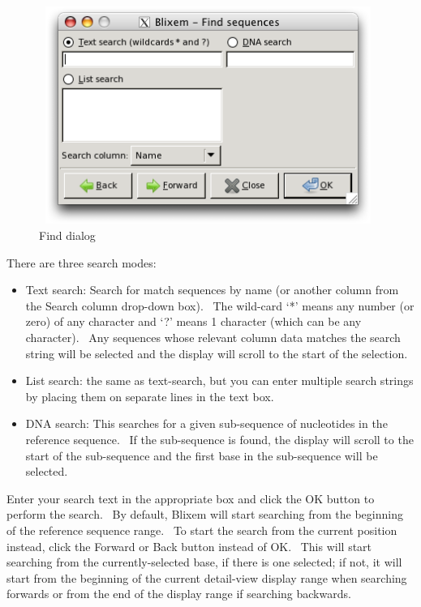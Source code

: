 \documentclass[letterpaper]{article}
\newcommand\liststyleWWviiiNumxxvii{%
\renewcommand\labelitemi{{\textbullet}}
\renewcommand\labelitemii{o}
\renewcommand\labelitemiii{[F0A7?]}
\renewcommand\labelitemiv{[F0B7?]}
}
\begin{document}
\begin{figure}
\centering
\color[rgb]{0.30980393,0.5058824,0.7411765}
\includegraphics[width=11.037cm,height=7.103cm]{img_dialog_find.png}
\caption{Find dialog}
\end{figure}

\bigskip

{There are three search modes:}

\liststyleWWviiiNumxxvii
\begin{itemize}
\item {
Text search: Search for match sequences by name (or another column from
the {\textquotesingle}Search column{\textquotesingle} drop-down box).
\ The wild-card {\textquoteleft}*{\textquoteright} means any number (or
zero) of any character and {\textquoteleft}?{\textquoteright} means 1
character (which can be any character). \ Any sequences whose relevant
column data matches the search string will be selected and the display
will scroll to the start of the selection. }
\item {
List search: the same as text-search, but you can enter multiple search
strings by placing them on separate lines in the text box.}
\item {
DNA search: This searches for a given sub-sequence of nucleotides in the
reference sequence. \ If the sub-sequence is found, the display will
scroll to the start of the sub-sequence and the first base in the
sub-sequence will be selected.}
\end{itemize}

{Enter your search text in the appropriate box and click the OK button to
perform the search. \ By default, Blixem will start searching from the
beginning of the reference sequence range. \ To start the search from
the current position instead, click the Forward or Back button instead
of OK. \ This will start searching from the currently-selected base, if
there is one selected; if not, it will start from the beginning of the
current detail-view display range when searching forwards or from the
end of the display range if searching backwards.}
\end{document}
